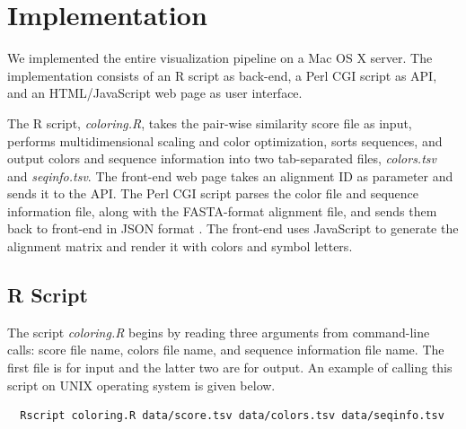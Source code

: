 \chapter{Implementation}\label{chap:Implementation}

We implemented the entire visualization pipeline on a Mac OS X server. The implementation consists of an R script as back-end, a Perl CGI script as API, and an HTML/JavaScript web page as user interface.

The R script, \emph{coloring.R}, takes the pair-wise similarity score file as input, performs multidimensional scaling and color optimization, sorts sequences, and output colors and sequence information into two tab-separated files, \emph{colors.tsv} and \emph{seqinfo.tsv}. The front-end web page takes an alignment ID as parameter and sends it to the API. The Perl CGI script parses the color file and sequence information file, along with the FASTA-format alignment file, and sends them back to front-end in JSON format \cite{crockford2006application}. The front-end uses JavaScript to generate the alignment matrix and render it with colors and symbol letters.

\section{R Script}

The script \emph{coloring.R} begins by reading three arguments from command-line calls: score file name, colors file name, and sequence information file name. The first file is for input and the latter two are for output. An example of calling this script on UNIX operating system is given below.
\begin{verbatim}
  Rscript coloring.R data/score.tsv data/colors.tsv data/seqinfo.tsv
\end{verbatim}

